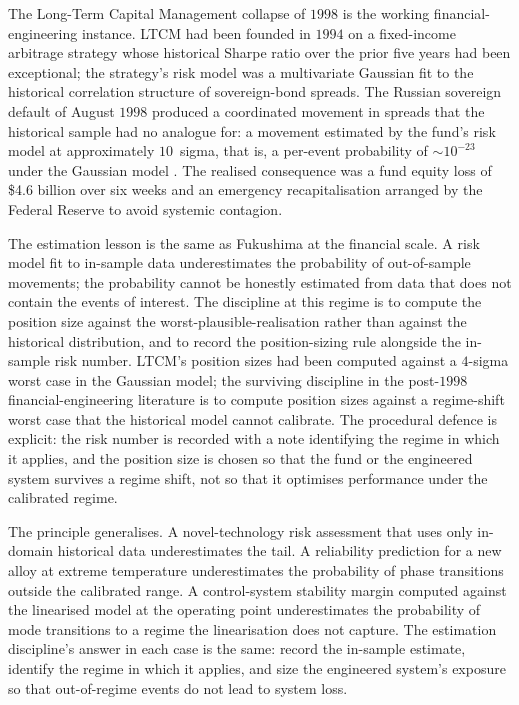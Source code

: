 The Long-Term Capital Management collapse of $1998$ is the
working financial-engineering instance. LTCM had been founded
in $1994$ on a fixed-income arbitrage strategy whose
historical Sharpe ratio over the prior five years had been
exceptional; the strategy's risk model was a multivariate
Gaussian fit to the historical correlation structure of
sovereign-bond spreads. The Russian sovereign default of
August $1998$ produced a coordinated movement in spreads that
the historical sample had no analogue for: a movement
estimated by the fund's risk model at approximately $10$~sigma,
that is, a per-event probability of $\sim 10^{-23}$ under the
Gaussian model
\cite{text:ch09t3-lowenstein-2000,paper:ch09t3-mackenzie-2003}.
The realised consequence was a fund equity loss of \$4.6
billion over six weeks and an emergency recapitalisation
arranged by the Federal Reserve to avoid systemic contagion.

The estimation lesson is the same as Fukushima at the
financial scale. A risk model fit to in-sample data
underestimates the probability of out-of-sample movements;
the probability cannot be honestly estimated from data that
does not contain the events of interest. The discipline at
this regime is to compute the position size against the
worst-plausible-realisation rather than against the
historical distribution, and to record the position-sizing
rule alongside the in-sample risk number. LTCM's position
sizes had been computed against a $4$-sigma worst case in
the Gaussian model; the surviving discipline in the
post-$1998$ financial-engineering literature is to compute
position sizes against a regime-shift worst case that the
historical model cannot calibrate. The procedural defence is
explicit: the risk number is recorded with a note identifying
the regime in which it applies, and the position size is
chosen so that the fund or the engineered system survives a
regime shift, not so that it optimises performance under the
calibrated regime.

The principle generalises. A novel-technology risk assessment
that uses only in-domain historical data underestimates the
tail. A reliability prediction for a new alloy at extreme
temperature underestimates the probability of phase
transitions outside the calibrated range. A control-system
stability margin computed against the linearised model at the
operating point underestimates the probability of mode
transitions to a regime the linearisation does not capture.
The estimation discipline's answer in each case is the same:
record the in-sample estimate, identify the regime in which
it applies, and size the engineered system's exposure so that
out-of-regime events do not lead to system loss.

